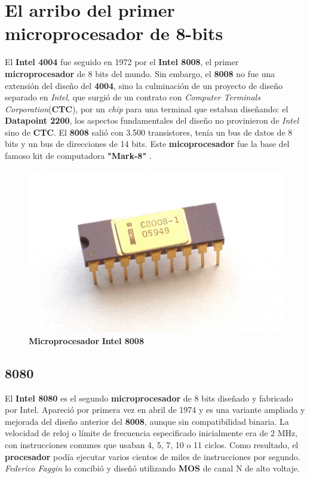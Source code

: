 \section{El arribo del primer \textbf{microprocesador} de 8-bits}
El \textbf{Intel 4004} fue seguido en 1972 por el \textbf{Intel 8008}, el primer \textbf{microprocesador} de 8 bits del mundo.
Sin embargo, el \textbf{8008} no fue una extensión del diseño del \textbf{4004}, sino la culminación de un proyecto de diseño separado
en \emph{Intel}, que surgió de un contrato con \emph{Computer Terminals Corporation}(\textbf{CTC}), por un \emph{chip} para
una terminal que estaban diseñando: el \textbf{Datapoint 2200}, los aspectos fundamentales del diseño no provinieron de \emph{Intel}
sino de \textbf{CTC}. El \textbf{8008} salió con 3.500 transistores, tenía un bus de datos de 8 bits y un bus de direcciones de 14 bits. Este
\textbf{micoprocesador} fue la base del famoso kit de computadora \textbf{"Mark-8"} .

\begin{figure}[htb]
	\centering
	\includegraphics[scale = 0.15]{Graphics/Intel_C8008-1.jpg}
	\caption{\textbf{Microprocesador}  \textbf{Intel 8008}}
	\label{fig:13}
\end{figure}

\subsection{\textbf{8080}}
El  \textbf{Intel 8080} es el segundo \textbf{microprocesador} de 8 bits diseñado y fabricado por Intel. Apareció por primera vez en abril de
1974 y es una variante ampliada y mejorada del diseño anterior del \textbf{8008}, aunque sin compatibilidad binaria. La velocidad de reloj o
límite de frecuencia especificado inicialmente era de 2 MHz, con instrucciones comunes que usaban 4, 5, 7, 10 o 11 ciclos. Como resultado,
el \textbf{procesador} podía ejecutar varios cientos de miles de instrucciones por segundo. \emph{Federico Faggin} lo concibió y diseñó 
utilizando \textbf{MOS} de canal N de alto voltaje.

